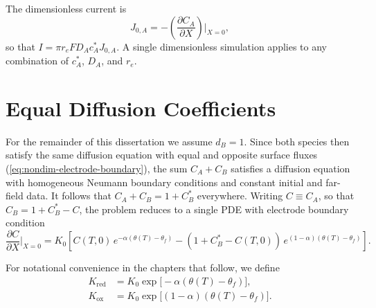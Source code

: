 The dimensionless current is
\begin{equation}
  J_{0,A} = -\left(\frac{\partial C_A}{\partial X}\right)\bigg|_{X=0},
  \label{eq:nd_flux}
\end{equation}
so that $I = \pi r_e F D_A c_A^* J_{0,A}$. A single dimensionless
simulation applies to any combination of $c_A^*$, $D_A$, and $r_e$.

\section{Equal Diffusion Coefficients}

For the remainder of this dissertation we assume $d_B = 1$. Since both
species then satisfy the same diffusion equation with equal and opposite
surface fluxes (\cref{eq:nondim-electrode-boundary}), the sum
$C_A + C_B$ satisfies a diffusion equation with homogeneous Neumann
boundary conditions and constant initial and far-field data.
It follows that $C_A + C_B = 1 + C_B^*$ everywhere. Writing $C \equiv
C_A$, so that $C_B = 1 + C_B^* - C$, the problem reduces to a single PDE
with electrode boundary condition
\begin{equation}
  \frac{\partial C}{\partial X}\bigg|_{X=0} =
  K_0 \left[ C(T,0)\, e^{-\alpha(\theta(T) - \theta_f)}
  - (1 + C_B^* - C(T,0))\, e^{(1-\alpha)(\theta(T) - \theta_f)} \right].
  \label{eq:equal_diff_bc}
\end{equation}

For notational convenience in the chapters that follow, we define
\begin{equation}
  \begin{aligned}
    K_{\text{red}} &= K_0 \exp\bigg[-\alpha(\theta(T) - \theta_f)\bigg], \\
    K_{\text{ox}} &= K_0 \exp\bigg[(1-\alpha)(\theta(T) - \theta_f)\bigg].
  \end{aligned}
  \label{eq:kred_kox}
\end{equation}
